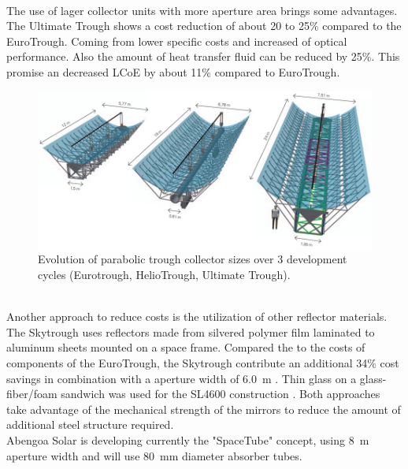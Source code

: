 \documentclass[Master,MEE,english]{twbook}%
\begin{document}
\\
The use of lager collector units with more aperture area brings some advantages. The Ultimate Trough shows a cost reduction of about 20 to 25\% compared to the EuroTrough. Coming from lower specific costs and increased of optical performance. Also the amount of heat transfer fluid can be reduced by 25\%. This promise an decreased LCoE by about 11\% compared to EuroTrough. \cite{VonReeken2014}
\begin{figure}[!h] 
\centering
\includegraphics[width=1\linewidth]{FIG/Kollektoren}
\caption[Evolution of parabolic trough collector sizes over 3 development cycles (Eurotrough, HelioTrough, Ultimate Trough).]{Evolution of parabolic trough collector sizes over 3 development cycles (Eurotrough, HelioTrough, Ultimate Trough)\cite{Schlaichbergermannundpartner}.}\label{Kollektoren}
\end{figure}
\\
Another approach to reduce costs is the utilization of other reflector materials. The Skytrough uses reflectors made from silvered polymer film laminated to aluminum sheets mounted on a space frame. Compared the to the costs of components of the EuroTrough, the Skytrough contribute an additional 34\% cost savings in combination with a aperture width of 6.0~m \cite{Mason2014}. Thin glass on a glass-fiber/foam sandwich was used for the SL4600 construction \cite{SolarliteCSPTechnologyGmbH2014}. Both approaches take advantage of the mechanical strength of the mirrors to reduce the amount of additional steel structure required.\\
Abengoa Solar is developing currently the "SpaceTube" concept, using 8~m aperture width and will use 80~mm diameter absorber tubes. \cite{Olar2013}
\pagebreak
\end{document}
